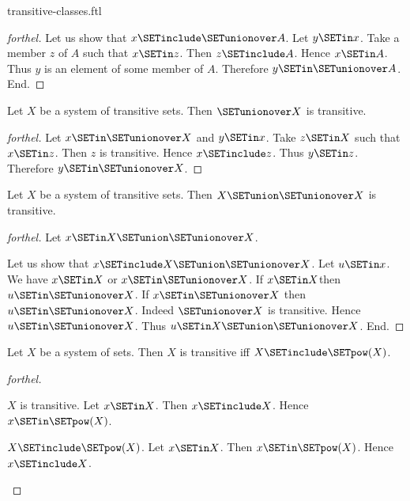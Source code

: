 \documentclass{stex}
\begin{document}
\begin{smodule}{transitive-classes.ftl}
\begin{proof}[forthel]
  Let us show that $x \SETinclude \SETunionover A$.
    Let $y \SETin x$.
    Take a member $z$ of $A$ such that $x \SETin z$.
    Then $z \SETinclude A$.
    Hence $x \SETin A$.
    Thus $y$ is an element of some member of $A$.
    Therefore $y \SETin \SETunionover A$.
  End.
\end{proof}

\begin{proposition}[forthel,id=SET_THEORY_01_6726468811882496]
  Let $X$ be a system of transitive sets.
  Then $\SETunionover X$ is transitive.
\end{proposition}
\begin{proof}[forthel]
  Let $x \SETin \SETunionover X$ and $y \SETin x$.
  Take $z \SETin X$ such that $x \SETin z$.
  Then $z$ is transitive.
  Hence $x \SETinclude z$.
  Thus $y \SETin z$.
  Therefore $y \SETin \SETunionover X$.
\end{proof}

\begin{proposition}[forthel,id=SET_THEORY_01_4884401668227072]
  Let $X$ be a system of transitive sets.
  Then $X \SETunion \SETunionover X$ is transitive.
\end{proposition}
\begin{proof}[forthel]
  Let $x \SETin X \SETunion \SETunionover X$.

  Let us show that $x \SETinclude X \SETunion \SETunionover X$.
    Let $u \SETin x$.
    We have $x \SETin X$ or $x \SETin \SETunionover X$.
    If $x \SETin X$then $u \SETin \SETunionover X$.
    If $x \SETin \SETunionover X$ then $u \SETin \SETunionover X$.
    Indeed $\SETunionover X$ is transitive.
    Hence $u \SETin \SETunionover X$.
    Thus $u \SETin X \SETunion \SETunionover X$.
  End.
\end{proof}

\begin{proposition}[forthel,id=SET_THEORY_01_1399002962591744]
  Let $X$ be a system of sets.
  Then $X$ is transitive iff $X \SETinclude \SETpow(X)$.
\end{proposition}
\begin{proof}[forthel]
  \begin{case}{$X$ is transitive.}
    Let $x \SETin X$.
    Then $x \SETinclude X$.
    Hence $x \SETin \SETpow(X)$.
  \end{case}

  \begin{case}{$X \SETinclude \SETpow(X)$.}
    Let $x \SETin X$.
    Then $x \SETin \SETpow(X)$.
    Hence $x \SETinclude X$.
  \end{case}
\end{proof}


\end{smodule}
\end{document}
